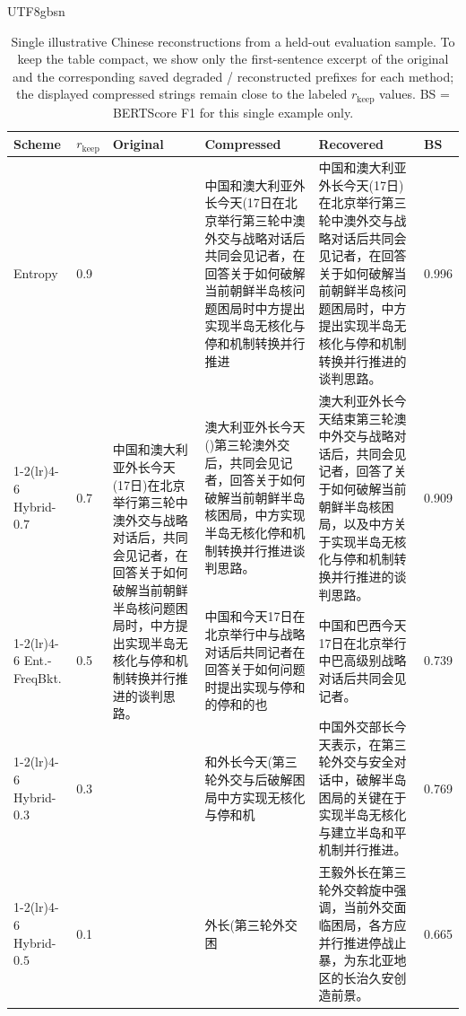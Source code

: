 \documentclass[11pt]{article}
\newcommand{\rkeep}{r_{\mathrm{keep}}}
\begin{document}
\begin{table}[!t]
\centering
\small
\caption{Single illustrative Chinese reconstructions from a held-out evaluation sample. To keep the table compact, we show only the first-sentence excerpt of the original and the corresponding saved degraded / reconstructed prefixes for each method; the displayed compressed strings remain close to the labeled $\rkeep$ values. BS = BERTScore F1 for this single example only.}
\label{tab:examples_zh}
\begin{CJK*}{UTF8}{gbsn}
\begin{tabular}{p{1.6cm}p{0.9cm}p{2.7cm}p{2.5cm}p{2.7cm}p{0.85cm}}
\toprule
\textbf{Scheme} & $\rkeep$ & \textbf{Original} & \textbf{Compressed} & \textbf{Recovered} & \textbf{BS} \\
\midrule
Entropy & 0.9 & \multirow{5}{2.7cm}{中国和澳大利亚外长今天(17日)在北京举行第三轮中澳外交与战略对话后，共同会见记者，在回答关于如何破解当前朝鲜半岛核问题困局时，中方提出实现半岛无核化与停和机制转换并行推进的谈判思路。} & 中国和澳大利亚外长今天(17日在北京举行第三轮中澳外交与战略对话后共同会见记者，在回答关于如何破解当前朝鲜半岛核问题困局时中方提出实现半岛无核化与停和机制转换并行推进 & 中国和澳大利亚外长今天(17日)在北京举行第三轮中澳外交与战略对话后共同会见记者，在回答关于如何破解当前朝鲜半岛核问题困局时，中方提出实现半岛无核化与停和机制转换并行推进的谈判思路。 & 0.996 \\
\cmidrule(lr){1-2}\cmidrule(lr){4-6}
Hybrid-$0.7$ & 0.7 &  & 澳大利亚外长今天()第三轮澳外交后，共同会见记者，回答关于如何破解当前朝鲜半岛核困局，中方实现半岛无核化停和机制转换并行推进谈判思路。 & 澳大利亚外长今天结束第三轮澳中外交与战略对话后，共同会见记者，回答了关于如何破解当前朝鲜半岛核困局，以及中方关于实现半岛无核化与停和机制转换并行推进的谈判思路。 & 0.909 \\
\cmidrule(lr){1-2}\cmidrule(lr){4-6}
Ent.-FreqBkt. & 0.5 &  & 中国和今天17日在北京举行中与战略对话后共同记者在回答关于如何问题时提出实现与停和的停和的也 & 中国和巴西今天17日在北京举行中巴高级别战略对话后共同会见记者。 & 0.739 \\
\cmidrule(lr){1-2}\cmidrule(lr){4-6}
Hybrid-$0.3$ & 0.3 &  & 和外长今天(第三轮外交与后破解困局中方实现无核化与停和机 & 中国外交部长今天表示，在第三轮外交与安全对话中，破解半岛困局的关键在于实现半岛无核化与建立半岛和平机制并行推进。 & 0.769 \\
\cmidrule(lr){1-2}\cmidrule(lr){4-6}
Hybrid-$0.5$ & 0.1 &  & 外长(第三轮外交困 & 王毅外长在第三轮外交斡旋中强调，当前外交面临困局，各方应并行推进停战止暴，为东北亚地区的长治久安创造前景。 & 0.665 \\
\bottomrule
\end{tabular}
\end{CJK*}
\end{table}
\end{document}
